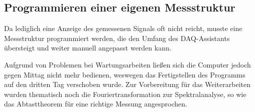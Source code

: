 	\newpage
	\subsection{Programmieren einer eigenen Messstruktur}
	
		Da lediglich eine Anzeige des gemessenen Signals oft nicht reicht, musste eine Messstruktur programmiert werden, die den Umfang des DAQ-Assistants übersteigt und weiter manuell angepasst werden kann.
		
		Aufgrund von Problemen bei Wartungsarbeiten ließen sich die Computer jedoch gegen Mittag nicht mehr bedienen, weswegen das Fertigstellen des Programms auf den dritten Tag verschoben wurde. 
		Zur Vorbereitung für das Weiterarbeiten wurden thematisch noch die Fouriertransformation zur Spektralanalyse, so wie das Abtasttheorem für eine richtige Messung angesprochen.